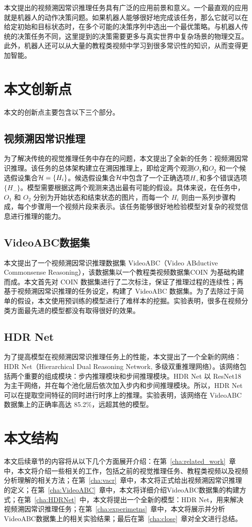 本文提出的视频溯因常识推理任务具有广泛的应用前景和意义。一个最直观的应用就是机器人的动作决策问题。如果机器人能够很好地完成该任务，那么它就可以在给定初始和目标状态时，在多个可能的决策序列中选出一个最优策略。与机器人传统的决策任务不同，这里提到的决策需要更多与真实世界中复杂场景的物理交互。此外，机器人还可以从大量的教程类视频中学习到很多常识性的知识，从而变得更加智能。

\section{本文创新点}
本文的创新点主要包含以下三个部分。
\subsection{视频溯因常识推理}
为了解决传统的视觉推理任务中存在的问题，本文提出了全新的任务：视频溯因常识推理。该任务的总体架构建立在溯因推理上，即给定两个观测$O_1$和$O_2$ 和一个候选假设集合${\mathcal{H}} = \{H_i\}$。候选假设集合${\mathcal{H}}$中包含了一个正确选项$H_+$和多个错误选项$\{H_-\}$。模型需要根据这两个观测来选出最有可能的假设。具体来说，在\VACR 任务中，$O_1$ 和 $O_2$ 分别为开始状态和结束状态的图片，而每一个 $H_i$ 则由一系列步骤构成，每个步骤用一个视频片段来表示。该任务能够很好地检验模型对复杂的视觉信息进行推理的能力。
\subsection{VideoABC数据集}
本文提出了一个视频溯因常识推理数据集 VideoABC（Video ABductive Commonsense Reasoning），该数据集以一个教程类视频数据集COIN\cite{tang2019coin} 为基础构建而成。本文首先对 COIN 数据集进行了二次标注，保证了推理过程的连续性；再基于视频溯因常识推理的任务设定，构建了 VideoABC 数据集。为了去除过于简单的假设，本文使用预训练的模型进行了难样本的挖掘。实验表明，很多在视频分类方面最先进的模型都没有取得很好的效果\cite{tran2018closer,wang2016temporal,carreira2017quo}。
\subsection{HDR Net}
为了提高模型在视频溯因常识推理任务上的性能，本文提出了一个全新的网络： HDR Net（Hierarchical Dual Reasoning Network, 多级双重推理网络）。该网络包括两个重要的组成模块：步内推理模块和步间推理模块。HDR Net 以 ResNet18\cite{he2016deep} 为主干网络，并在每个池化层后依次加入步内和步间推理模块。所以，HDR Net 可以在提取空间特征的同时进行时序上的推理。实验表明，该网络在 VideoABC 数据集上的正确率高达 85.2\%，远超其他的模型。

\section{本文结构}
本文后续章节的内容将从以下几个方面展开介绍：在第~\ref{cha:related_work}~章中，本文将介绍一些相关的工作，包括之前的视觉推理任务、教程类视频以及视频分析理解的相关方法；在第~\ref{cha:vacr}~章中，本文将正式给出视频溯因常识推理的定义；在第~\ref{cha:VideoABC}~章中，本文将详细介绍VideoABC数据集的构建方式；在第~\ref{cha:HDRNet}~中，本文将提出一个全新的模型：HDR Net，用来解决视频溯因常识推理任务；在第~\ref{cha:experimetns}~章中，本文将展示并分析VideoABC数据集上的相关实验结果；最后在第~\ref{cha:close}~章对全文进行总结。